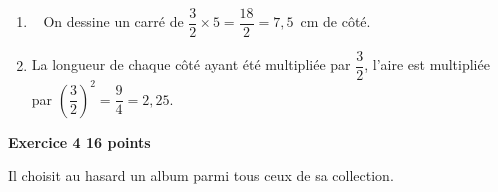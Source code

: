 \documentclass[10pt]{article}
\begin{document}

\begin{enumerate}
\item ~%
On dessine un carré de $\dfrac{3}{2} \times 5 = \dfrac{18}{2} = 7,5$~cm de côté.
\item %

La longueur de chaque côté ayant été multipliée par $\dfrac{3}{2}$, l'aire est multipliée par $\left(\dfrac{3}{2}\right)^2 = \dfrac{9}{4} = 2,25$.
\end{enumerate}

\vspace{0.5cm}

\textbf{Exercice 4 \hfill 16 points}

\medskip

%
%
 
Il choisit au hasard un album parmi tous ceux de sa collection.
\medskip
\end{document}
